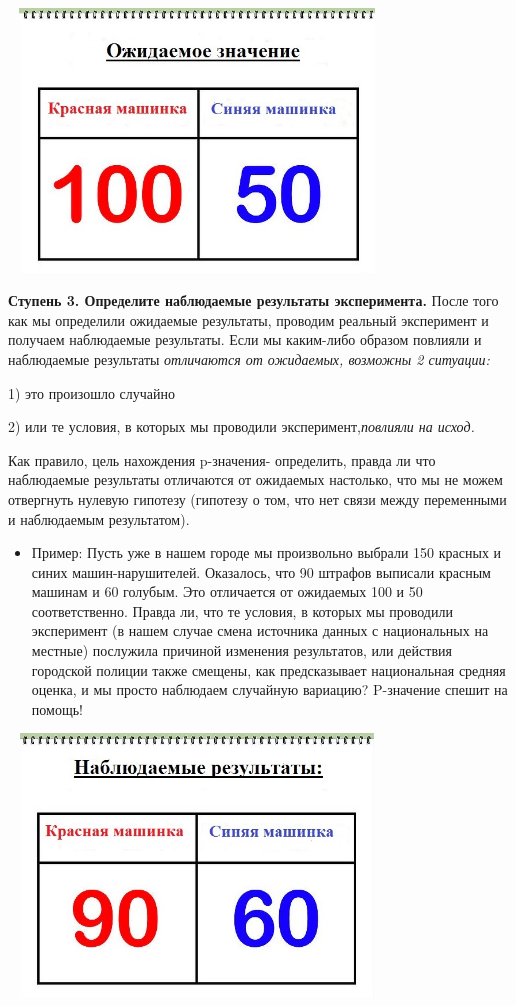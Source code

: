 \documentclass[final,pdftex]{../../template/epsilonj}
\numberwithin{equation}{section}
\begin{document}
\includegraphics[width=100mm,height=70mm]{1.jpg}

\textbf{Ступень 3. Определите наблюдаемые результаты эксперимента.} После того как мы определили ожидаемые результаты, проводим реальный эксперимент и получаем наблюдаемые результаты. Если мы каким-либо образом повлияли и наблюдаемые результаты \em{отличаются} от ожидаемых, возможны 2 ситуации:

1) это произошло случайно

2) или те условия, в которых мы проводили эксперимент,\em{повлияли} на исход.

Как правило, цель нахождения p-значения- определить, правда ли что наблюдаемые результаты отличаются от ожидаемых настолько, что мы не можем отвергнуть нулевую гипотезу (гипотезу о том, что нет связи между переменными и наблюдаемым результатом).

\begin{itemize}
	\item Пример: Пусть уже в нашем городе мы произвольно выбрали 150 красных и синих машин-нарушителей. Оказалось, что 90 штрафов выписали красным машинам и 60 голубым. Это отличается от ожидаемых 100 и 50 соответственно. Правда ли, что те условия, в которых мы проводили эксперимент (в нашем случае смена источника данных с национальных на местные) послужила причиной изменения результатов, или действия городской полиции также смещены, как предсказывает национальная средняя оценка, и мы просто наблюдаем случайную вариацию? P-значение спешит на помощь!
\end{itemize}

\includegraphics[width=100mm,height=70mm]{2.jpg}
\end{document}

